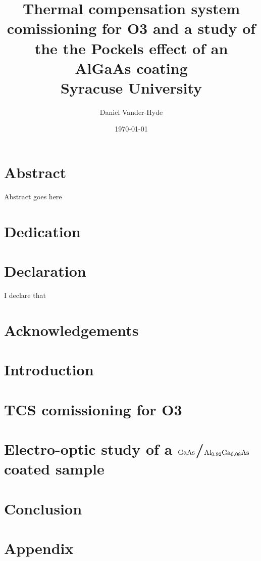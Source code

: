 \documentclass[12pt]{report}
\title{
{Thermal compensation system comissioning for O3 and a study of the
the Pockels effect of an AlGaAs coating}\\
{\large Syracuse University}\\
}
\author{Daniel Vander-Hyde}
\date{\today}
\newcommand{\algaas}{\mathrm{Al_{0.92}Ga_{0.08}As}}
\newcommand{\gaas}{\mathrm{GaAs}}
\begin{document}
\maketitle

\chapter*{Abstract}
Abstract goes here

\chapter*{Dedication}

\chapter*{Declaration}
I declare that

\chapter*{Acknowledgements}


\tableofcontents

\maketitle

\newpage


\chapter{Introduction}

\newpage

\chapter{TCS comissioning for O3}


\chapter{Electro-optic study of a $\protect\gaas$/$\protect\algaas$ coated sample}


\chapter{Conclusion}

\newpage
\chapter{Appendix}




\end{document}
